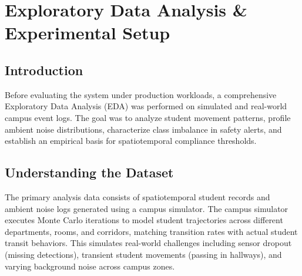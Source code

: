 \documentclass[12pt,a4paper,oneside]{report}
\begin{document}
\begin{algorithm}[H]
\caption{CSP Timetable Scheduling Backtracking Search with MRV/LCV}

\Return{\FBacktrack{$\emptyset$}}\;
\end{algorithm}

\chapter{Exploratory Data Analysis \& Experimental Setup}
\thispagestyle{empty} 

\section{Introduction}
Before evaluating the system under production workloads, a comprehensive Exploratory Data Analysis (EDA) was performed on simulated and real-world campus event logs. The goal was to analyze student movement patterns, profile ambient noise distributions, characterize class imbalance in safety alerts, and establish an empirical basis for spatiotemporal compliance thresholds.

\section{Understanding the Dataset}
The primary analysis data consists of spatiotemporal student records and ambient noise logs generated using a campus simulator. The campus simulator executes Monte Carlo iterations to model student trajectories across different departments, rooms, and corridors, matching transition rates with actual student transit behaviors. This simulates real-world challenges including sensor dropout (missing detections), transient student movements (passing in hallways), and varying background noise across campus zones.
\end{document}

